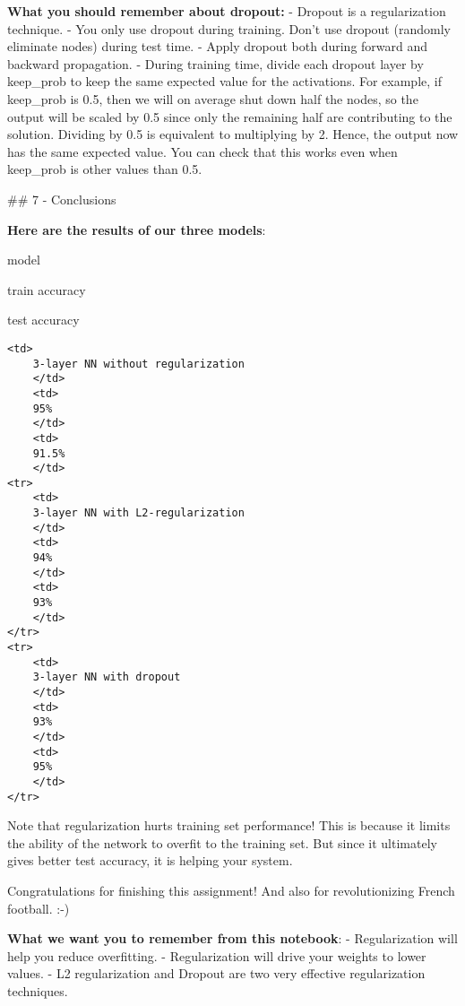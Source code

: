 \documentclass[11pt]{article}
\makeatletter
\newcommand{\boxspacing}{\kern\kvtcb@left@rule\kern\kvtcb@boxsep}
\newcommand{\prompt}[4]{
        \ttfamily\llap{{\color{#2}[#3]:\hspace{3pt}#4}}\vspace{-\baselineskip}
    }
\makeatother
\begin{document}
\textbf{What you should remember about dropout:} - Dropout is a
regularization technique. - You only use dropout during training. Don't
use dropout (randomly eliminate nodes) during test time. - Apply dropout
both during forward and backward propagation. - During training time,
divide each dropout layer by keep\_prob to keep the same expected value
for the activations. For example, if keep\_prob is 0.5, then we will on
average shut down half the nodes, so the output will be scaled by 0.5
since only the remaining half are contributing to the solution. Dividing
by 0.5 is equivalent to multiplying by 2. Hence, the output now has the
same expected value. You can check that this works even when keep\_prob
is other values than 0.5.

    \#\# 7 - Conclusions

    \textbf{Here are the results of our three models}:

model

train accuracy

test accuracy

\begin{verbatim}
<td>
    3-layer NN without regularization
    </td>
    <td>
    95%
    </td>
    <td>
    91.5%
    </td>
<tr>
    <td>
    3-layer NN with L2-regularization
    </td>
    <td>
    94%
    </td>
    <td>
    93%
    </td>
</tr>
<tr>
    <td>
    3-layer NN with dropout
    </td>
    <td>
    93%
    </td>
    <td>
    95%
    </td>
</tr>
\end{verbatim}

    Note that regularization hurts training set performance! This is because
it limits the ability of the network to overfit to the training set. But
since it ultimately gives better test accuracy, it is helping your
system.

    Congratulations for finishing this assignment! And also for
revolutionizing French football. :-)

    \textbf{What we want you to remember from this notebook}: -
Regularization will help you reduce overfitting. - Regularization will
drive your weights to lower values. - L2 regularization and Dropout are
two very effective regularization techniques.

    \begin{tcolorbox}[breakable, size=fbox, boxrule=1pt, pad at break*=1mm,colback=cellbackground, colframe=cellborder]
\prompt{In}{incolor}{ }{\boxspacing}
\begin{Verbatim}[commandchars=\\\{\}]

\end{Verbatim}
\end{tcolorbox}


    
    
    
\end{document}
